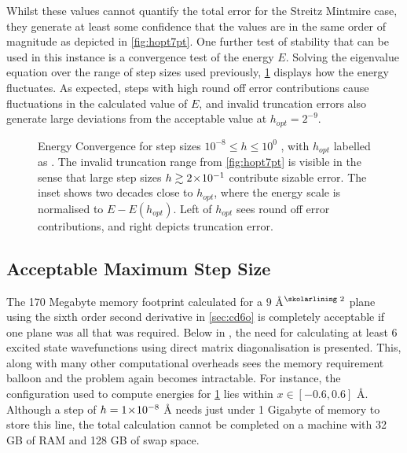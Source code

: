Whilst these values cannot quantify the total error for the Streitz Mintmire case, they generate at least some confidence that the values are in the same order of magnitude as depicted in \cref{fig:hopt7pt}. 
One further test of stability that can be used in this instance is a convergence test of the energy $E$.
Solving the eigenvalue equation over the range of step sizes used previously, \cref{fig:econv} displays how the energy fluctuates. 
As expected, steps with high round off error contributions cause fluctuations in the calculated value of $E$, and invalid truncation errors also generate large deviations from the acceptable value at $h_{opt} = 2^{-9}$.
\begin{figure}[htp]
\centering
\resizebox{0.9\columnwidth}{!}{}
\caption[Energy Convergence]{\label{fig:econv}Energy Convergence for step sizes $10^{-8}\!\leq\! h\! \leq\! 10^0$ , with $h_{opt}$ labelled as . The invalid truncation range from \cref{fig:hopt7pt} is visible in the sense that large step sizes $h\gtrsim2\!\times\!10^{-1}$ contribute sizable error. The inset shows two decades close to $h_{opt}$, where the energy scale is normalised to $E-E(h_{opt})$. Left of $h_{opt}$ sees round off error contributions, and right depicts truncation error.}
\end{figure}

\subsection{Acceptable Maximum Step Size}

The 170 Megabyte memory footprint calculated for a $9$ Å$^\text{\skolarlining 2}$ plane using the sixth order second derivative in \cref{sec:cd6o} is completely acceptable if one plane was all that was required.
Below in , the need for calculating at least 6 excited state wavefunctions using direct matrix diagonalisation is presented.
This, along with many other computational overheads sees the memory requirement balloon and the problem again becomes intractable. 
For instance, the  configuration used to compute energies for \cref{fig:econv} lies within $x \in [-0.6, 0.6]$ Å.
Although a step of $h = 1\!\times\!10^{-8}$ Å needs just under 1 Gigabyte of memory to store this line, the total calculation cannot be completed on a machine with 32 GB of RAM and 128 GB of swap space.

